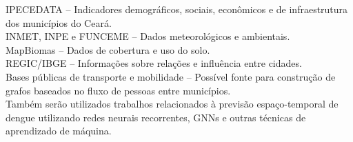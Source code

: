 \documentclass{article}
\begin{document}
IPECEDATA -- Indicadores demográficos, sociais, econômicos e de infraestrutura dos municípios do Ceará. \\

INMET, INPE e FUNCEME -- Dados meteorológicos e ambientais. \\

MapBiomas -- Dados de cobertura e uso do solo. \\

REGIC/IBGE -- Informações sobre relações e influência entre cidades. \\

Bases públicas de transporte e mobilidade -- Possível fonte para construção de grafos baseados no fluxo de pessoas entre municípios. \\

Também serão utilizados trabalhos relacionados à previsão espaço-temporal de dengue utilizando redes neurais recorrentes, GNNs e outras técnicas de aprendizado de máquina.
\end{document}
